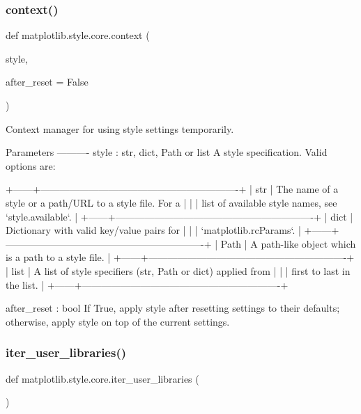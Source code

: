 \subsubsection{\texorpdfstring{context()}{context()}}
{\footnotesize\ttfamily def matplotlib.\+style.\+core.\+context (\begin{DoxyParamCaption}\item[{}]{style,  }\item[{}]{after\+\_\+reset = {\ttfamily False} }\end{DoxyParamCaption})}

\begin{DoxyVerb}Context manager for using style settings temporarily.

Parameters
----------
style : str, dict, Path or list
    A style specification. Valid options are:

    +------+-------------------------------------------------------------+
    | str  | The name of a style or a path/URL to a style file. For a    |
    |      | list of available style names, see `style.available`.       |
    +------+-------------------------------------------------------------+
    | dict | Dictionary with valid key/value pairs for                   |
    |      | `matplotlib.rcParams`.                                      |
    +------+-------------------------------------------------------------+
    | Path | A path-like object which is a path to a style file.         |
    +------+-------------------------------------------------------------+
    | list | A list of style specifiers (str, Path or dict) applied from |
    |      | first to last in the list.                                  |
    +------+-------------------------------------------------------------+

after_reset : bool
    If True, apply style after resetting settings to their defaults;
    otherwise, apply style on top of the current settings.
\end{DoxyVerb}
 \mbox{\label{namespacematplotlib_1_1style_1_1core_afff002c2298cc82b0e7d48197cc56dc8}} 
\subsubsection{\texorpdfstring{iter\+\_\+user\+\_\+libraries()}{iter\_user\_libraries()}}
{\footnotesize\ttfamily def matplotlib.\+style.\+core.\+iter\+\_\+user\+\_\+libraries (\begin{DoxyParamCaption}{ }\end{DoxyParamCaption})}

